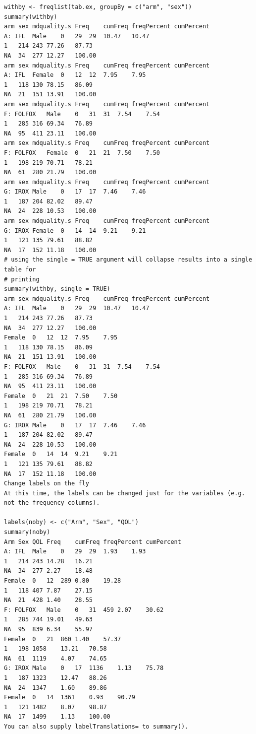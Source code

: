 \documentclass[
]{book}
\begin{document}
\begin{verbatim}
withby <- freqlist(tab.ex, groupBy = c("arm", "sex"))
summary(withby)
arm sex mdquality.s Freq    cumFreq freqPercent cumPercent
A: IFL  Male    0   29  29  10.47   10.47
1   214 243 77.26   87.73
NA  34  277 12.27   100.00
arm sex mdquality.s Freq    cumFreq freqPercent cumPercent
A: IFL  Female  0   12  12  7.95    7.95
1   118 130 78.15   86.09
NA  21  151 13.91   100.00
arm sex mdquality.s Freq    cumFreq freqPercent cumPercent
F: FOLFOX   Male    0   31  31  7.54    7.54
1   285 316 69.34   76.89
NA  95  411 23.11   100.00
arm sex mdquality.s Freq    cumFreq freqPercent cumPercent
F: FOLFOX   Female  0   21  21  7.50    7.50
1   198 219 70.71   78.21
NA  61  280 21.79   100.00
arm sex mdquality.s Freq    cumFreq freqPercent cumPercent
G: IROX Male    0   17  17  7.46    7.46
1   187 204 82.02   89.47
NA  24  228 10.53   100.00
arm sex mdquality.s Freq    cumFreq freqPercent cumPercent
G: IROX Female  0   14  14  9.21    9.21
1   121 135 79.61   88.82
NA  17  152 11.18   100.00
# using the single = TRUE argument will collapse results into a single table for
# printing
summary(withby, single = TRUE)
arm sex mdquality.s Freq    cumFreq freqPercent cumPercent
A: IFL  Male    0   29  29  10.47   10.47
1   214 243 77.26   87.73
NA  34  277 12.27   100.00
Female  0   12  12  7.95    7.95
1   118 130 78.15   86.09
NA  21  151 13.91   100.00
F: FOLFOX   Male    0   31  31  7.54    7.54
1   285 316 69.34   76.89
NA  95  411 23.11   100.00
Female  0   21  21  7.50    7.50
1   198 219 70.71   78.21
NA  61  280 21.79   100.00
G: IROX Male    0   17  17  7.46    7.46
1   187 204 82.02   89.47
NA  24  228 10.53   100.00
Female  0   14  14  9.21    9.21
1   121 135 79.61   88.82
NA  17  152 11.18   100.00
Change labels on the fly
At this time, the labels can be changed just for the variables (e.g. not the frequency columns).

labels(noby) <- c("Arm", "Sex", "QOL")
summary(noby)
Arm Sex QOL Freq    cumFreq freqPercent cumPercent
A: IFL  Male    0   29  29  1.93    1.93
1   214 243 14.28   16.21
NA  34  277 2.27    18.48
Female  0   12  289 0.80    19.28
1   118 407 7.87    27.15
NA  21  428 1.40    28.55
F: FOLFOX   Male    0   31  459 2.07    30.62
1   285 744 19.01   49.63
NA  95  839 6.34    55.97
Female  0   21  860 1.40    57.37
1   198 1058    13.21   70.58
NA  61  1119    4.07    74.65
G: IROX Male    0   17  1136    1.13    75.78
1   187 1323    12.47   88.26
NA  24  1347    1.60    89.86
Female  0   14  1361    0.93    90.79
1   121 1482    8.07    98.87
NA  17  1499    1.13    100.00
You can also supply labelTranslations= to summary().


\end{verbatim}
\end{document}
